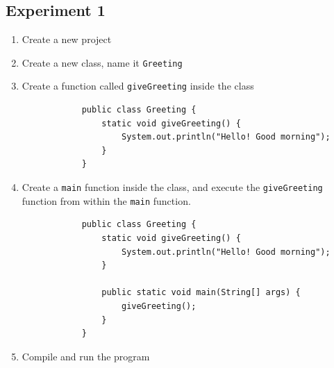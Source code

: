 \documentclass[12pt,titlepage]{article}
\begin{document}
\subsection{Experiment 1}
\begin{enumerate}
    \item Create a new project
    \item Create a new class, name it \texttt{Greeting}
    \item {
        Create a function called \texttt{giveGreeting} inside the class

        \begin{verbatim}
            public class Greeting {
                static void giveGreeting() {
                    System.out.println("Hello! Good morning");
                }
            }
        \end{verbatim}
    }
    \item {
        Create a \texttt{main} function inside the class, and execute the \texttt{giveGreeting}
        function from within the \texttt{main} function.

        \begin{verbatim}
            public class Greeting {
                static void giveGreeting() {
                    System.out.println("Hello! Good morning");
                }

                public static void main(String[] args) {
                    giveGreeting();
                }
            }
        \end{verbatim}
    }
    \item {
        Compile and run the program
    }
\end{enumerate}
\end{document}
